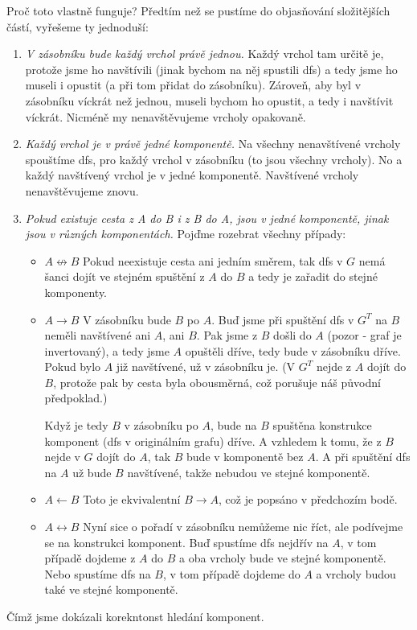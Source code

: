 \documentclass{article}
\begin{document}
Proč toto vlastně funguje? Předtím než se pustíme do objasňování složitějších částí, vyřešeme ty jednoduší:
\begin{enumerate}
    \item \textit{V zásobníku bude každý vrchol právě jednou.} Každý vrchol tam určitě je, protože jsme ho navštívili (jinak bychom na něj spustili dfs)
    a tedy jsme ho museli i opustit (a při tom přidat do zásobníku). Zároveň, aby byl v zásobníku víckrát než jednou, museli bychom ho opustit,
    a tedy i navštívit víckrát. Nicméně my nenavštěvujeme vrcholy opakovaně.
    \item \textit{Každý vrchol je v právě jedné komponentě.} Na všechny nenavštívené vrcholy spouštíme dfs, pro každý vrchol v zásobníku (to jsou všechny vrcholy).
    No a každý navštívený vrchol je v jedné komponentě. Navštívené vrcholy nenavštěvujeme znovu.
    \item \textit{Pokud existuje cesta z A do B i z B do A, jsou v jedné komponentě, jinak jsou v různých komponentách.} Pojďme rozebrat všechny případy:
    \begin{itemize}
        \item \(A \not\leftrightarrow B\) Pokud neexistuje cesta ani jedním směrem, tak dfs v \(G\) nemá šanci dojít ve stejném spuštění
        z \(A\) do \(B\) a tedy je zařadit do stejné komponenty.
        \item \(A \rightarrow B\) V zásobníku bude \(B\) po \(A\). Buď jsme při spuštění dfs v \(G^T\) na \(B\) neměli navštívené ani \(A\), ani \(B\).
        Pak jsme z \(B\) došli do \(A\) (pozor - graf je invertovaný), a tedy jsme \(A\) opuštěli dříve, tedy bude v zásobníku dříve. Pokud bylo \(A\)
        již navštívené, už v zásobníku je. (V \(G^T\) nejde z \(A\) dojít do \(B\), protože pak by cesta byla obousměrná, což porušuje náš původní předpoklad.)

        Když je tedy \(B\) v zásobníku po \(A\), bude na \(B\) spuštěna konstrukce komponent (dfs v originálním grafu) dříve. A vzhledem k tomu, že z \(B\) nejde
        v \(G\) dojít do \(A\), tak \(B\) bude v komponentě bez \(A\). A při spuštění dfs na \(A\) už bude \(B\) navštívené, takže nebudou ve stejné komponentě.
        \item \(A \leftarrow B\) Toto je ekvivalentní \(B \rightarrow A\), což je popsáno v předchozím bodě.
        \item \(A \leftrightarrow B\) Nyní sice o pořadí v zásobníku nemůžeme nic říct, ale podívejme se na konstrukci komponent. Buď spustíme dfs nejdřív na \(A\),
        v tom případě dojdeme z \(A\) do \(B\) a oba vrcholy bude ve stejné komponentě. Nebo spustíme dfs na \(B\), v tom případě dojdeme do \(A\) a vrcholy budou
        také ve stejné komponentě.
    \end{itemize}
\end{enumerate}
Čímž jsme dokázali korekntonst hledání komponent.
\end{document}
